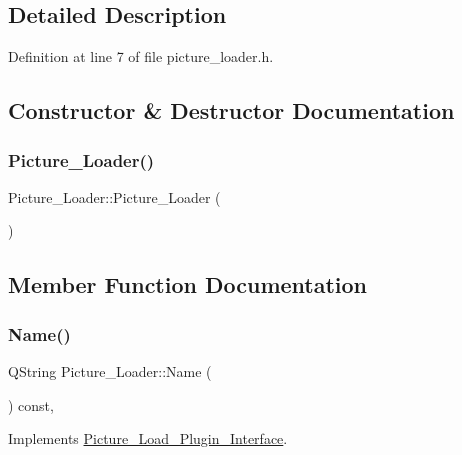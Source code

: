 \subsection{Detailed Description}


Definition at line 7 of file picture\+\_\+loader.\+h.



\subsection{Constructor \& Destructor Documentation}
\mbox{\label{classPicture__Loader_a632cf36df138f0b8bd94f514d61dfa95}} 
\subsubsection{\texorpdfstring{Picture\+\_\+\+Loader()}{Picture\_Loader()}}
{\footnotesize\ttfamily Picture\+\_\+\+Loader\+::\+Picture\+\_\+\+Loader (\begin{DoxyParamCaption}{ }\end{DoxyParamCaption})\hspace{0.3cm}{\ttfamily [default]}}



\subsection{Member Function Documentation}
\mbox{\label{classPicture__Loader_a043165c946b7bf29dea761463b8cb5fa}} 
\subsubsection{\texorpdfstring{Name()}{Name()}}
{\footnotesize\ttfamily Q\+String Picture\+\_\+\+Loader\+::\+Name (\begin{DoxyParamCaption}{ }\end{DoxyParamCaption}) const\hspace{0.3cm}{\ttfamily [override]}, {\ttfamily [virtual]}}



Implements \hyperlink{classPicture__Load__Plugin__Interface_a7cb4c7354f06bc7408ce1072e46db030}{Picture\+\_\+\+Load\+\_\+\+Plugin\+\_\+\+Interface}.



